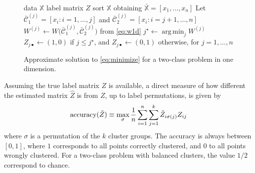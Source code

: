 \documentclass[aps,preprint,nofootinbib,floatfix]{revtex4-1}
\DeclareMathOperator*{\argmin}{arg\,min}
\newcommand\C{{\mathcal{C}}}
\begin{document}
\begin{figure}
\begin{algorithm}[H]\vspace{.5em}
\begin{algorithmic}[1]
\INPUT data $\mathbb{X}$
\OUTPUT label matrix $Z$
\STATE sort $\mathbb{X}$ obtaining 
$\bar{\mathbb{X}}= [ x_1,\dotsc,x_n ]$
        \STATE Let $\bar{\C}_1^{(j)} = [x_i: i=1,\dotsc,j]$ and 
                $\bar{\C}_2^{(j)} = [x_i : i=j+1,\dotsc,n]$
        \STATE  
            $W^{(j)} \leftarrow W \big( \bar{\C}_1^{(j)},\bar{\C}_2^{(j)}  
            \big)$ from \eqref{eq:w1d}
    \ENDFOR
    \STATE $j^\star \leftarrow \argmin_j W^{(j)}$ 
    \STATE $Z_{j\bullet} \leftarrow (1,0) $ if $j\le j^\star$, and
           $Z_{j\bullet} \leftarrow (0,1)$ otherwise, for $j=1,\dotsc,n$
\end{algorithmic}
\caption{
\label{algo1d}
Approximate solution to \eqref{eq:minimize} 
for a two-class problem in one dimension. \hspace{\fill}
}
\end{algorithm}
\end{figure}

Assuming the true label matrix $Z$ is available, a direct
measure of how different the estimated matrix $\hat{Z}$ 
is from $Z$, up to label
permutations, is given by
\begin{equation}
\label{eq:accuracy}
\textnormal{accuracy}(\hat{Z}) \equiv \max_\sigma
\dfrac{1}{n}\sum_{i=1}^n\sum_{j=1}^k \hat{Z}_{i \sigma(j)} Z_{ij}
\end{equation}
where $\sigma$ is a permutation
of the $k$ cluster groups. 
The accuracy is always between $[0,1]$, where
$1$ corresponds to all points correctly clustered, and 
$0$ to all points wrongly clustered.
For a two-class problem with balanced
clusters, the value $1/2$ correspond
to chance.
\end{document}
